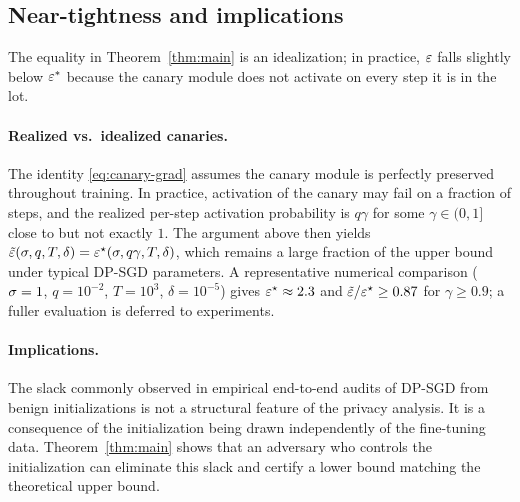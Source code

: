 \subsection{Near-tightness and implications}
\label{sec:tightness}

The equality in Theorem~\ref{thm:main} is an idealization; in practice, $\varepsilon$ falls slightly below $\varepsilon^*$ because the canary module does not activate on every step it is in the lot.

\paragraph{Realized vs.\ idealized canaries.} The identity
\eqref{eq:canary-grad} assumes the canary module is perfectly preserved
throughout training. In practice, activation of the canary may fail on
a fraction of steps, and the realized per-step activation probability
is $q\gamma$ for some $\gamma \in (0, 1]$ close to but not exactly $1$.
The argument above then yields
$\tilde{\varepsilon}(\sigma, q, T, \delta) = \varepsilon^\star(\sigma, q\gamma, T, \delta)$,
which remains a large fraction of the upper bound under typical
DP-SGD parameters. A representative numerical comparison
($\sigma = 1$, $q = 10^{-2}$, $T = 10^3$, $\delta = 10^{-5}$) gives
$\varepsilon^\star \approx 2.3$ and $\tilde{\varepsilon} / \varepsilon^\star \geq 0.87$ for
$\gamma \geq 0.9$; a fuller evaluation is deferred to experiments.

\paragraph{Implications.} The slack commonly observed in empirical
end-to-end audits of DP-SGD from benign initializations is not a
structural feature of the privacy analysis. It is a consequence of the
initialization being drawn independently of the fine-tuning data.
Theorem~\ref{thm:main} shows that an adversary who controls the
initialization can eliminate this slack and certify a lower bound
matching the theoretical upper bound.